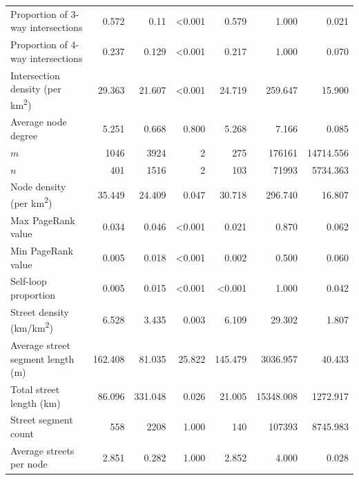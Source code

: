 \documentclass[Afour,sageh,times]{sagej}
\begin{document}
\begin{table}
\begin{tabular}{ l r r r r r r }
	Proportion of 3-way intersections                & 0.572   & 0.11    & \textless0.001 & 0.579          & 1.000     & 0.021    \\
	Proportion of 4-way intersections                & 0.237   & 0.129   & \textless0.001 & 0.217          & 1.000     & 0.070    \\
	Intersection density (per km\textsuperscript{2}) & 29.363  & 21.607  & \textless0.001 & 24.719         & 259.647   & 15.900   \\
	Average node degree                              & 5.251   & 0.668   & 0.800          & 5.268          & 7.166     & 0.085    \\
	$m$                                              & 1046    & 3924    & 2              & 275            & 176161    & 14714.556\\
	$n$                                              & 401     & 1516    & 2              & 103            & 71993     & 5734.363 \\
	Node density (per km\textsuperscript{2})         & 35.449  & 24.409  & 0.047          & 30.718         & 296.740   & 16.807   \\
	Max PageRank value                               & 0.034   & 0.046   & \textless0.001 & 0.021          & 0.870     & 0.062    \\
	Min PageRank value                               & 0.005   & 0.018   & \textless0.001 & 0.002          & 0.500     & 0.060    \\
	Self-loop proportion                             & 0.005   & 0.015   & \textless0.001 & \textless0.001 & 1.000     & 0.042    \\
	Street density (km/km\textsuperscript{2})        & 6.528   & 3.435   & 0.003          & 6.109          & 29.302    & 1.807    \\
	Average street segment length (m)                & 162.408 & 81.035  & 25.822         & 145.479        & 3036.957  & 40.433   \\
	Total street length (km)                         & 86.096  & 331.048 & 0.026          & 21.005         & 15348.008 & 1272.917 \\
	Street segment count                             & 558     & 2208    & 1.000          & 140            & 107393    & 8745.983 \\
	Average streets per node                         & 2.851   & 0.282   & 1.000          & 2.852          & 4.000     & 0.028    \\
	\bottomrule
\end{tabular}
\end{table}
\end{document}

